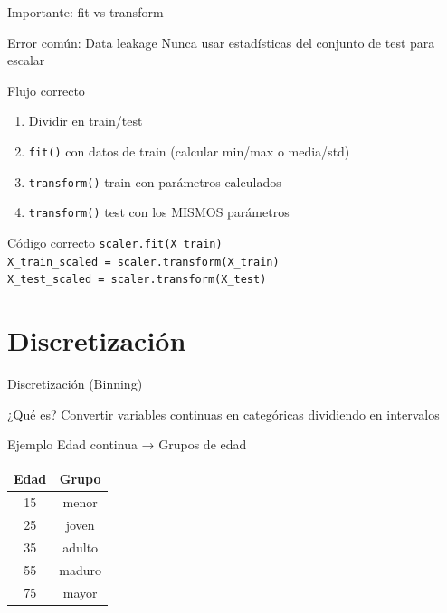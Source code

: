 \documentclass[aspectratio=169]{beamer}
\begin{document}
\begin{frame}{Importante: fit vs transform}
\begin{alertblock}{Error común: Data leakage}
Nunca usar estadísticas del conjunto de test para escalar
\end{alertblock}

\begin{block}{Flujo correcto}
\begin{enumerate}
    \item Dividir en train/test
    \item \texttt{fit()} con datos de train (calcular min/max o media/std)
    \item \texttt{transform()} train con parámetros calculados
    \item \texttt{transform()} test con los MISMOS parámetros
\end{enumerate}
\end{block}

\pause

\begin{exampleblock}{Código correcto}
\texttt{scaler.fit(X\_train)}\\
\texttt{X\_train\_scaled = scaler.transform(X\_train)}\\
\texttt{X\_test\_scaled = scaler.transform(X\_test)}
\end{exampleblock}
\end{frame}

\section{Discretización}

\begin{frame}{Discretización (Binning)}
\begin{block}{¿Qué es?}
Convertir variables continuas en categóricas dividiendo en intervalos
\end{block}

\begin{exampleblock}{Ejemplo}
Edad continua → Grupos de edad

\begin{center}
\begin{tabular}{|c|c|}
\hline
\textbf{Edad} & \textbf{Grupo} \\
\hline
15 & menor \\
25 & joven \\
35 & adulto \\
55 & maduro \\
75 & mayor \\
\hline
\end{tabular}
\end{center}
\end{exampleblock}
\end{frame}
\end{document}
